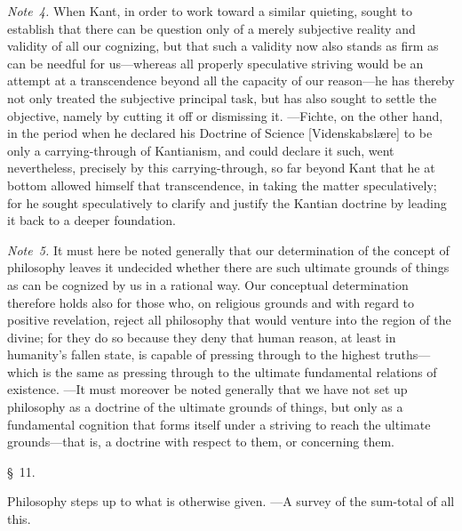 \documentclass[12pt,a4paper]{book}
\begin{document}
{\small\emph{Note~4.} When Kant, in order to work toward a similar quieting, sought
to establish that there can be question only of a merely subjective reality and
validity of all our cognizing, but that such a validity now also stands as firm as
can be needful for us---whereas all properly speculative striving would be an
attempt at a transcendence beyond all the capacity of our reason---he has thereby
not only treated the subjective principal task, but has also sought to settle the
objective, namely by cutting it off or dismissing it. ---Fichte, on the other hand,
in the period when he declared his Doctrine of Science [Videnskabslære] to be only
a carrying-through of Kantianism, and could declare it such, went nevertheless,
precisely by this carrying-through, so far beyond Kant that he at bottom allowed
himself that transcendence, in taking the matter speculatively; for he sought
speculatively to clarify and justify the Kantian doctrine by leading it back to a
deeper foundation.\par}

{\small\emph{Note~5.} It must here be noted generally that our determination of the
concept of philosophy leaves it undecided whether there are such ultimate grounds
of things as can be cognized by us in a rational way. Our conceptual determination
therefore holds also for those who, on religious grounds and with regard to
positive revelation, reject all philosophy that would venture into the region of
the divine; for they do so because they deny that human reason, at least in
humanity's fallen state, is capable of pressing through to the highest truths---%
which is the same as pressing through to the ultimate fundamental relations of
existence. ---It must moreover be noted generally that we have not set up
philosophy as a doctrine of the ultimate grounds of things, but only as a
fundamental cognition that forms itself under a striving to reach the ultimate
grounds---that is, a doctrine with respect to them, or concerning them.\par}

\begin{center}\large\S~11.\end{center}
\begin{center}Philosophy steps up to what is otherwise given. ---A survey of the
sum-total of all this.\end{center}
\end{document}
